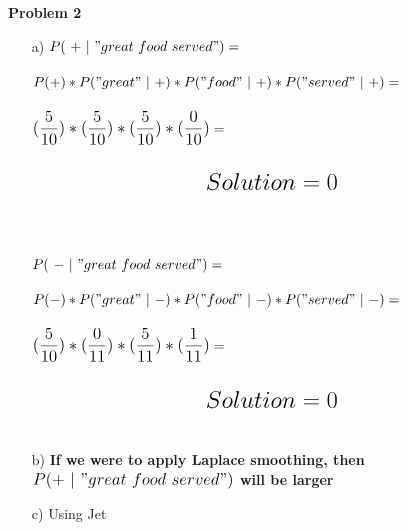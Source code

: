 \documentclass[ruled]{article}
\begin{document}
\textbf{Problem 2}
\begin{itemize}
\item[a) ]
$P(\ +\ |\ "great\ food\ served") = $ \\ \\
$P(+) * P("great"\ |\ +) * P("food"\ |\ +) * P("served"\ |\ +) = $ \\ \\
$\mathlarger{\mathlarger{(\frac{5}{10}) * (\frac{5}{10}) * (\frac{5}{10}) * (\frac{0}{10})}} = $\\ \\
$$\mathlarger{\mathlarger{\mathlarger{Solution = 0}}}$$\\
\\ \\ 
$P(\ -\ |\ "great\ food\ served") = $ \\ \\
$P(-) * P("great"\ |\ -) * P("food"\ |\ -) * P("served"\ |\ -) = $ \\ \\
$\mathlarger{\mathlarger{(\frac{5}{10}) * (\frac{0}{11}) * (\frac{5}{11}) * (\frac{1}{11})}} = $\\ \\
$$\mathlarger{\mathlarger{\mathlarger{Solution = 0}}}$$\\
\item[b) ]
\textbf{If we were to apply Laplace smoothing, then $\mathlarger{\mathlarger{P(+\ |\ "great\ food\ served")}}$ will be larger}
\item[c) ] Using Jet
\end{itemize}
\newpage
\end{document}
